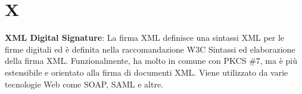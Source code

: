 \section{X}
\textbf{XML Digital Signature}: La firma XML definisce una sintassi XML per le firme digitali ed è definita nella raccomandazione W3C Sintassi ed elaborazione della firma XML. Funzionalmente, ha molto in comune con PKCS \#7, ma è più estensibile e orientato alla firma di documenti XML. Viene utilizzato da varie tecnologie Web come SOAP, SAML e altre.\\